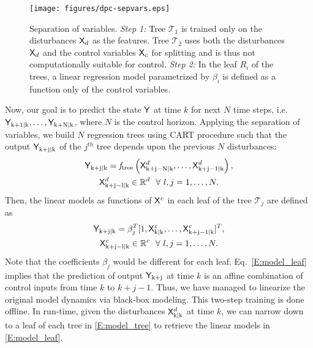 \begin{figure}[t!]
	\centering
	\texttt{[image: figures/dpc-sepvars.eps]}
	\caption{Separation of variables. \textit{Step 1:} Tree $\mathcal{T}_1$ is trained only on the disturbances $\mathsf{X}_d$ as the features. Tree $\mathcal{T}_2$ uses both the disturbances $\mathsf{X}_d$ and the control variables $\mathsf{X}_c$ for splitting and is thus not computationally suitable for control. \textit{Step 2:} In the leaf $R_i$ of the trees, a linear regression model parametrized by $\beta_i$ is defined as a function only of the control variables.}
	\captionsetup{justification=centering}
	\label{F:dpc-sepvars}
\end{figure}

Now, our goal is to predict the state $\mathsf{Y}$ at time $k$ for next $N$ time steps, i.e. $\mathsf{Y}_{\mathrm{k+1|k}},\dots,\mathsf{Y}_{\mathrm{k+N|k}}$, where $N$ is the control horizon. Applying the separation of variables, we build $N$ regression trees using CART procedure \cite{Breiman1984} such that the output $\mathsf{Y}_{\mathrm{k+j|k}}$ of the $j^{th}$ tree depends upon the previous $N$ disturbances:
\begin{gather}
\label{E:model_tree}
\mathsf{Y}_{\mathrm{k+j|k}} = \mathit{f}_{\mathrm{tree}} \left( \mathsf{X}^d_{\mathrm{k+j-N|k}} ,\dots,\mathsf{X}^d_{\mathrm{k+j-1|k}}  \right), \\ \nonumber
\mathsf{X}^d_{\mathrm{k+j-l|k}} \in \mathbb{R}^d \  \ \forall \ l,j=1,\dots,N.
\end{gather}
Then, the linear models as functions of $\mathsf{X}^c$ in each leaf of the tree $\mathcal{T}_j$ are defined as
\begin{gather}
\label{E:model_leaf}
\mathsf{Y}_{\mathrm{k+j|k}} =  \beta^T_j [1,\mathsf{X}^c_{\mathrm{k|k}},\dots,\mathsf{X}^c_{\mathrm{k+j-1|k}} ]^T, \\ \nonumber
\mathsf{X}^c_{\mathrm{k+j-l|k}} \in \mathbb{R}^c \  \ \forall \ l,j=1,\dots,N.
\end{gather}
Note that the coefficients $\beta_j$ would be different for each leaf. Eq.~\eqref{E:model_leaf} implies that the prediction of output $\mathsf{Y}_{\mathrm{k+j}}$ at time $k$ is an affine combination of control inputs from time $k$ to $k+j-1$. Thus, we have managed to linearize the original model dynamics via black-box modeling. This two-step training is done offline. In run-time, given the disturbances $\mathsf{X}^d_\mathrm{k|k}$ at time $k$, we can narrow down to a leaf of each tree in \eqref{E:model_tree} to retrieve the linear models in \eqref{E:model_leaf}.

